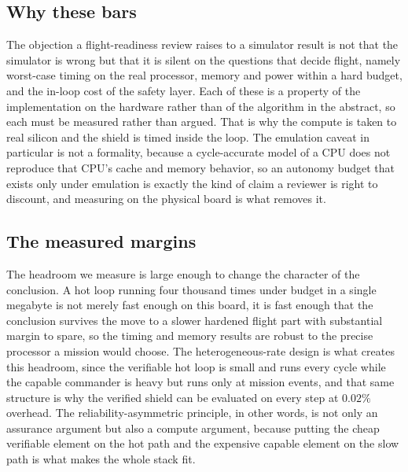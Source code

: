 \documentclass[journal]{IEEEtran}
\begin{document}
\subsection{Why these bars} The objection a flight-readiness
review raises to a simulator result is not that the simulator is wrong but that it is silent on
the questions that decide flight, namely worst-case timing on the real processor, memory and power
within a hard budget, and the in-loop cost of the safety layer. Each of these is a property of the
implementation on the hardware rather than of the algorithm in the abstract, so each must be
measured rather than argued. That is why the compute is taken to real silicon and the shield is
timed inside the loop. The emulation caveat in particular is not a formality, because a
cycle-accurate model of a CPU does not reproduce that CPU's cache and memory behavior, so an
autonomy budget that exists only under emulation is exactly the kind of claim a reviewer is right
to discount, and measuring on the physical board is what removes it.

\subsection{The measured margins} The headroom we measure is large enough to change the
character of the conclusion. A hot loop running four thousand times under budget in a single
megabyte is not merely fast enough on this board, it is fast enough that the conclusion survives
the move to a slower hardened flight part with substantial margin to spare, so the timing and
memory results are robust to the precise processor a mission would choose. The heterogeneous-rate
design is what creates this headroom, since the verifiable hot loop is small and runs every cycle
while the capable commander is heavy but runs only at mission events, and that same structure is
why the verified shield can be evaluated on every step at $0.02\%$ overhead. The reliability-asymmetric
principle, in other words, is not only an assurance argument but also a compute argument, because
putting the cheap verifiable element on the hot path and the expensive capable element on the slow
path is what makes the whole stack fit.
\end{document}
